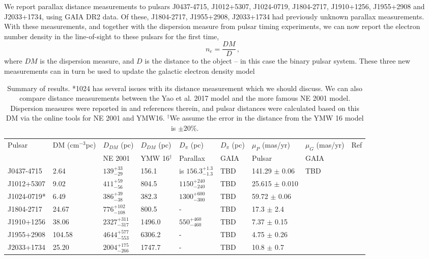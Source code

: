 \documentclass[iop,apj]{emulateapj}
\def\beq{\begin{equation}}
\def\eeq{\end{equation}}
\begin{document}
We report parallax distance measurements to pulsars J0437-4715, J1012+5307, J1024-0719, J1804-2717, J1910+1256, J1955+2908 and J2033+1734, using GAIA DR2 data. Of these, J1804-2717, J1955+2908, J2033+1734 had previously unknown parallax measurements. With these measurements, and together with the dispersion measure from pulsar timing experiments, we can now report the electron number density in the line-of-sight to these pulsars for the first time,
\beq
n_e = \frac{DM}{D}\, ,
\eeq
where $DM$ is the dispersion measure, and $D$ is the distance to the object -- in this case the binary pulsar system. These three new measurements can in turn be used to update the galactic electron density model~\cite{cl02,cl03, ymw+17}
\begin{table}[h]
\begin{center}
\caption{\label{tab:results} Summary of results. *1024 has several issues with its distance measurement which we should discuss. We can also compare distance measurements between the Yao et al. 2017 model and the more famous NE 2001 model. Dispersion measures were reported in \cite{v+16} and references therein, and pulsar distances were calculated based on this DM via the online tools for NE 2001 and YMW16. $ ^\dagger$We assume the error in the distance from the YMW 16 model is $\pm 20\%$. }
\begin{tabular}{@{\;\;}l@{\;\;}l@{\;}l@{\;}l@{\;}l@{\;}l@{\;}l@{\;}l@{\;}c@{\;}}
\hline\hline
Pulsar 		& DM (cm$^{-3}$pc)	& $D_{DM}$ (pc) & $D_{DM}$ (pc) & $D_\pi$ (pc) & $D_\pi$ (pc) & $\mu_P$ (mas/yr) 	& $\mu_G$ (mas/yr)& Ref\\
			&			&NE 2001 	&YMW 16$ ^\dagger$		& Parallax			& GAIA		& Pulsar & GAIA\\
\hline
 J0437-4715 	& 2.64  & $139^{+33}_{-29}$ & 156.1 &is $156.3^{+1.3}_{-1.3}$ 	& TBD		&	141.29 $\pm$ 0.06 	&  TBD 	&	\cite{v+16, dvt+08, dcl+16}\\
 J1012+5307 	& 9.02	& $411^{+59}_{-56}$	& 804.5 		& $1150^{+240}_{-240}$		&TBD			&	25.615 $\pm$ 0.010	&		& 	\cite{v+16, dcl+16}\\
 J1024-0719* 	& 6.49	& $386^{+39}_{-38}$	&	382.3	& $1300^{+600}_{-300}$		&TBD			&	59.72 $\pm$ 0.06	&		& 	\cite{v+16, kkn+16, dcl+16}\\
 J1804-2717 	& 24.67	&  	$776^{+102}_{-108}$	& 800.5 		& -							&TBD			&	17.3 $\pm$ 2.4		&		& 	\cite{v+16, dcl+16}\\
 J1910+1256 	& 38.06	& $2327^{+311}_{-317}$	&1496.0 		& $550^{+460}_{-460}$		&TBD			&	7.37 $\pm$ 0.15		&		&	\cite{v+16, dcl+16}\\
 J1955+2908 	&104.58	&  $4644^{+577}_{-553}$		&	6306.2 	& -							&TBD			&	4.75 $\pm$ 0.26		& 		&	\cite{v+16, dcl+16}\\
 J2033+1734 	& 25.20	& $2004^{+175}_{-266}$ 	&	1747.7 	& -							&TBD			&	10.8 $\pm$ 0.7		&		& 	\cite{v+16, dcl+16}\\
 \hline \hline
 \end{tabular}
\end{center}
\end{table}
\end{document}
